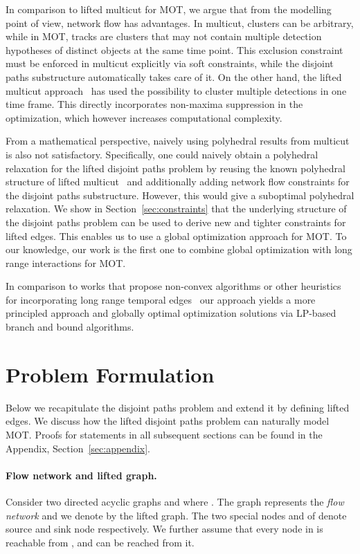 \documentclass{article}
\begin{document}
In comparison to lifted multicut for MOT, we argue that from the modelling point of view, network flow has advantages.
In multicut, clusters can be arbitrary, while in MOT, tracks are clusters that may not contain multiple detection hypotheses of distinct objects at the same time point.
This exclusion constraint must be enforced in multicut explicitly via soft constraints, while the disjoint paths substructure automatically takes care of it.
On the other hand, the lifted multicut approach~\cite{tang2017multiple} has used the possibility to cluster multiple detections in one time frame.
This directly incorporates non-maxima suppression in the optimization, which however increases computational complexity.

From a mathematical perspective, naively using polyhedral results from multicut is also not satisfactory.
Specifically, one could naively obtain a polyhedral relaxation for the lifted disjoint paths problem by reusing the known polyhedral structure of lifted multicut~\cite{hornakova2017analysis} and additionally adding network flow constraints for the disjoint paths substructure.
However, this would give a suboptimal polyhedral relaxation. 
We show in Section~\ref{sec:constraints} that the underlying structure of the disjoint paths problem can be used to derive new and tighter constraints for lifted edges.
This enables us to use a global optimization approach for MOT.
To our knowledge, our work is the first one to combine global optimization with long range interactions for MOT.



In comparison to works that propose non-convex algorithms or other heuristics for incorporating long range temporal edges~\cite{Henschel_2018_CVPR_Workshops,hu2019dual,zamir2012gmcp,dehghan2015gmmcp} our approach yields a more principled approach and globally optimal optimization solutions via LP-based branch and bound algorithms.
  \section{Problem Formulation}
\label{sec:problem-formulation}
Below we recapitulate the disjoint paths problem and extend it by defining lifted edges.
We discuss how the lifted disjoint paths problem can naturally model MOT.
Proofs for statements in all subsequent sections can be found in the Appendix, Section~\ref{sec:appendix}.

\paragraph{Flow network and lifted graph.}
Consider two directed acyclic graphs  and  where .
The graph  represents the \emph{flow network} and we denote by  the lifted graph. 
The two special nodes  and  of  denote source and sink node respectively. 
We further assume that every node in  is reachable from , and  can be reached from it.
\end{document}
